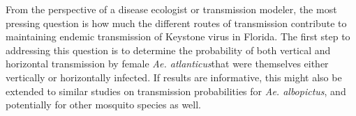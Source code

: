 \documentclass[12pt]{article}
\newcommand{\alb}{\textit{Ae. albopictus}}
\newcommand{\atl}{\textit{Ae. atlanticus}}
\begin{document}
        From the perspective of a disease ecologist or transmission modeler, the most pressing question is how much the different routes of transmission contribute to maintaining endemic transmission of Keystone virus in Florida. The first step to addressing this question is to determine the probability of both vertical and horizontal transmission by female \atl that were themselves either vertically or horizontally infected. If results are informative, this might also be extended to similar studies on transmission probabilities for \alb, and potentially for other mosquito species as well.

    
\end{document}
